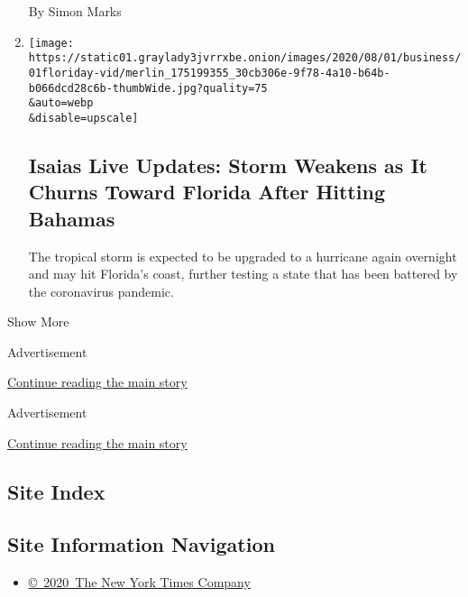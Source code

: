\begin{enumerate}
  By Simon Marks
\item
  \href{/2020/08/01/us/hurricane-isaias-track.html}{}

  \texttt{[image: https://static01.graylady3jvrrxbe.onion/images/2020/08/01/business/01floriday-vid/merlin\_175199355\_30cb306e-9f78-4a10-b64b-b066dcd28c6b-thumbWide.jpg?quality=75\\\&auto=webp\\\&disable=upscale]}

  \hypertarget{isaias-live-updates-storm-weakens-as-it-churns-toward-florida-after-hitting-bahamas}{%
  \subsection{Isaias Live Updates: Storm Weakens as It Churns Toward
  Florida After Hitting
  Bahamas}\label{isaias-live-updates-storm-weakens-as-it-churns-toward-florida-after-hitting-bahamas}}

  The tropical storm is expected to be upgraded to a hurricane again
  overnight and may hit Florida's coast, further testing a state that
  has been battered by the coronavirus pandemic.
\end{enumerate}

Show More

Advertisement

\protect\hyperlink{after-mid1}{Continue reading the main story}

Advertisement

\protect\hyperlink{after-mktg}{Continue reading the main story}

\hypertarget{site-index}{%
\subsection{Site Index}\label{site-index}}

\hypertarget{site-information-navigation}{%
\subsection{Site Information
Navigation}\label{site-information-navigation}}

\begin{itemize}
\tightlist
\item
  \href{https://help.nytimes3xbfgragh.onion/hc/en-us/articles/115014792127-Copyright-notice}{©~2020~The
  New York Times Company}
\end{itemize}

